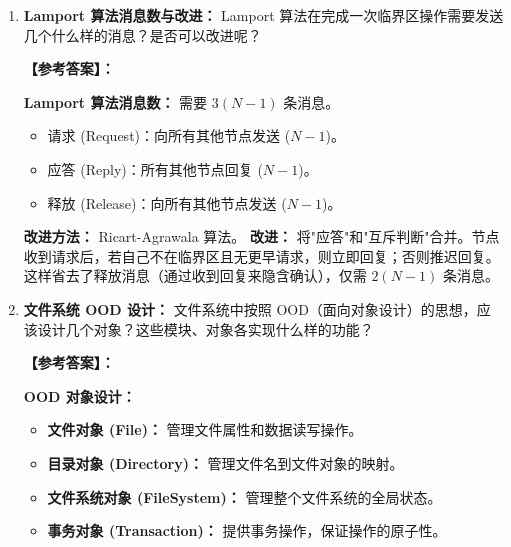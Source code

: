 \documentclass[a4paper,12pt]{article}
\newcommand{\answer}[1]{\par\vspace{0.5em}\hspace{2em}\textbf{【参考答案】：}\\{\color{blue}#1}\par\vspace{1em}}
\begin{document}
\begin{enumerate}[label=\arabic*.]
    \answer{
    \textbf{原因：} 分布式系统中没有全局时钟，需要一种机制来确定事件的全局顺序，用于调试、日志、分布式算法等。
    
    \textbf{算法：} Lamport 逻辑时钟算法。
    
    \textbf{实现方法：}
    \begin{itemize}
        \item 每个进程维护一个逻辑计数器。
        \item 发送消息时，计数器加 1 并附加在消息中。
        \item 接收消息时，将本地计数器更新为 $\max(\text{本地值}, \text{消息时间戳}) + 1$。
    \end{itemize}
    
    \textbf{举例：} 可以用于实现分布式互斥算法中的请求排序。
    }
    
    \item \textbf{Lamport 算法消息数与改进：}
    Lamport 算法在完成一次临界区操作需要发送几个什么样的消息？是否可以改进呢？
    
    \answer{
    \textbf{Lamport 算法消息数：} 需要 $3(N-1)$ 条消息。
    \begin{itemize}
        \item 请求 (Request)：向所有其他节点发送 ($N-1$)。
        \item 应答 (Reply)：所有其他节点回复 ($N-1$)。
        \item 释放 (Release)：向所有其他节点发送 ($N-1$)。
    \end{itemize}
    
    \textbf{改进方法：} Ricart-Agrawala 算法。
    \textbf{改进：} 将"应答"和"互斥判断"合并。节点收到请求后，若自己不在临界区且无更早请求，则立即回复；否则推迟回复。这样省去了释放消息（通过收到回复来隐含确认），仅需 $2(N-1)$ 条消息。
    }

    \item \textbf{文件系统 OOD 设计：}
    文件系统中按照 OOD（面向对象设计）的思想，应该设计几个对象？这些模块、对象各实现什么样的功能？
    
    \answer{
    \textbf{OOD 对象设计：}
    \begin{itemize}
        \item \textbf{文件对象 (File)：} 管理文件属性和数据读写操作。
        \item \textbf{目录对象 (Directory)：} 管理文件名到文件对象的映射。
        \item \textbf{文件系统对象 (FileSystem)：} 管理整个文件系统的全局状态。
        \item \textbf{事务对象 (Transaction)：} 提供事务操作，保证操作的原子性。
    \end{itemize}
    
}
\end{enumerate}
\end{document}
